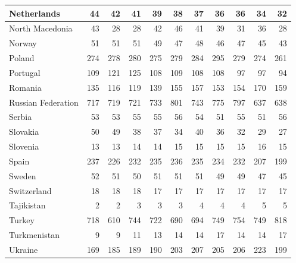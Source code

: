 \begin{table}
\begin{tabular}{|l|r|r|r|r|r|r|r|r|r|r|}
                   Netherlands&     44&     42&     41&     39&     38&     37&     36&     36&     34&     32\\\hline
               North Macedonia&     43&     28&     28&     42&     46&     41&     39&     31&     36&     28\\\hline
                        Norway&     51&     51&     51&     49&     47&     48&     46&     47&     45&     43\\\hline
                        Poland&    274&    278&    280&    275&    279&    284&    295&    279&    274&    261\\\hline
                      Portugal&    109&    121&    125&    108&    109&    108&    108&     97&     97&     94\\\hline
                       Romania&    135&    116&    119&    139&    155&    157&    153&    154&    170&    159\\\hline
            Russian Federation&    717&    719&    721&    733&    801&    743&    775&    797&    637&    638\\\hline
                        Serbia&     53&     53&     55&     55&     56&     54&     51&     55&     51&     56\\\hline
                      Slovakia&     50&     49&     38&     37&     34&     40&     36&     32&     29&     27\\\hline
                      Slovenia&     13&     13&     14&     14&     15&     15&     15&     15&     16&     15\\\hline
                         Spain&    237&    226&    232&    235&    236&    235&    234&    232&    207&    199\\\hline
                        Sweden&     52&     51&     50&     51&     51&     51&     49&     49&     47&     45\\\hline
                   Switzerland&     18&     18&     18&     17&     17&     17&     17&     17&     17&     17\\\hline
                    Tajikistan&      2&      2&      3&      3&      3&      4&      4&      4&      5&      5\\\hline
                        Turkey&    718&    610&    744&    722&    690&    694&    749&    754&    749&    818\\\hline
                  Turkmenistan&      9&      9&     11&     13&     14&     14&     17&     14&     14&     17\\\hline
                       Ukraine&    169&    185&    189&    190&    203&    207&    205&    206&    223&    199\\\hline

\end{tabular}
\end{table}
